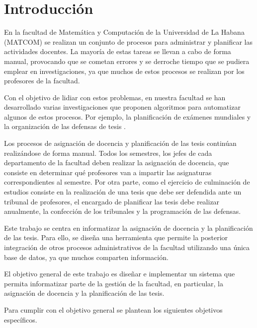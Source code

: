 \chapter*{Introducción}\label{chapter:introduction}

En la facultad de Matemática y Computación de la Universidad de La Habana (MATCOM)
se realizan un conjunto de procesos para administrar y
planificar las actividades docentes. La mayoría de 
estas tareas se llevan a cabo de forma manual, provocando que se 
cometan errores y se derroche tiempo que se pudiera emplear en 
investigaciones, ya que muchos de estos procesos se realizan por 
los profesores de la facultad. 

Con el objetivo de lidiar con estos problemas, en nuestra facultad se han desarrollado 
varias investigaciones que proponen algoritmos para automatizar algunos 
de estos procesos. Por ejemplo, la planificación de exámenes 
mundiales \cite{mundiales} y la organización de las defensas de tesis \cite{tribunales}.

Los procesos de asignación de docencia y planificación de 
las tesis continúan realizándose de forma manual. 
Todos los semestres, los jefes de cada departamento de la facultad deben realizar la asignación de docencia, 
que consiste en determinar qué profesores van a impartir las asignaturas correspondientes 
al semestre.
Por otra parte, como el ejercicio de culminación de estudios consiste en la realización 
de una tesis que debe ser defendida ante un tribunal de profesores, el encargado 
de planificar las tesis debe realizar anualmente, la confección de los tribunales y la programación de las defensas. 

Este trabajo se centra en informatizar la asignación de docencia y 
la planificación de las tesis. Para ello, se diseña una herramienta que permite 
la posterior integración de otros procesos administrativos de la facultad utilizando una única base de datos, ya que muchos 
comparten información.


El objetivo general de este trabajo es diseñar e implementar un sistema
que permita informatizar parte de la gestión de la facultad, en particular, 
la asignación de docencia y la planificación de las tesis.

Para cumplir con el objetivo general se plantean los siguientes objetivos 
específicos. 

